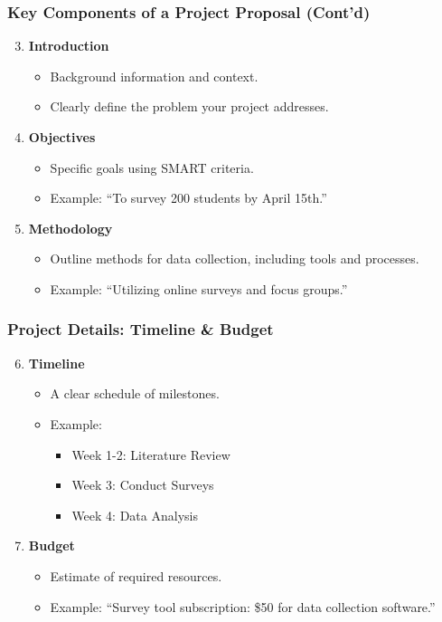 \documentclass[aspectratio=169]{beamer}
\begin{document}
\begin{frame}[fragile]
    \frametitle{Key Components of a Project Proposal (Cont'd)}
    \begin{enumerate}
        \setcounter{enumi}{2} %
        \item \textbf{Introduction}
            \begin{itemize}
                \item Background information and context.
                \item Clearly define the problem your project addresses.
            \end{itemize}
        \item \textbf{Objectives}
            \begin{itemize}
                \item Specific goals using SMART criteria.
                \item Example: “To survey 200 students by April 15th.”
            \end{itemize}
        \item \textbf{Methodology}
            \begin{itemize}
                \item Outline methods for data collection, including tools and processes.
                \item Example: “Utilizing online surveys and focus groups.”
            \end{itemize}
    \end{enumerate}
\end{frame}

\begin{frame}[fragile]
    \frametitle{Project Details: Timeline & Budget}
    \begin{enumerate}
        \setcounter{enumi}{5} %
        \item \textbf{Timeline}
            \begin{itemize}
                \item A clear schedule of milestones.
                \item Example: 
                \begin{itemize}
                    \item Week 1-2: Literature Review
                    \item Week 3: Conduct Surveys
                    \item Week 4: Data Analysis
                \end{itemize}
            \end{itemize}
        \item \textbf{Budget}
            \begin{itemize}
                \item Estimate of required resources.
                \item Example: “Survey tool subscription: \$50 for data collection software.”
            \end{itemize}
    \end{enumerate}
\end{frame}
\end{document}
